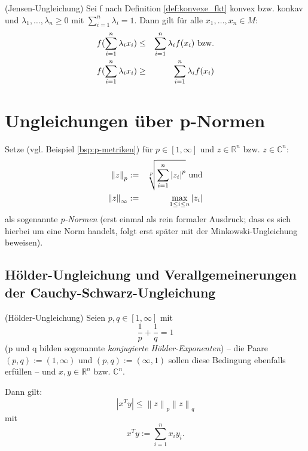 \documentclass[10pt]{scrbook}
\begin{document}
\begin{Sa} (Jensen-Ungleichung)
Sei f nach Definition \ref{def:konvexe_fkt} konvex bzw. konkav und $\lambda_1, \ldots, \lambda_n\geq 0$ mit $\sum_{i=1}^n \lambda_i =1$. Dann gilt für alle $x_1, \ldots, x_n\in M$:
\begin{eqnarray*}
f(\sum_{i=1}^n \lambda_i x_i) & \leq & \sum_{i=1}^n \lambda_i f(x_i) \textnormal{ bzw.}\\
f(\sum_{i=1}^n \lambda_i x_i) & \geq & \sum_{i=1}^n \lambda_i f(x_i)
\end{eqnarray*}
\end{Sa}

\section{Ungleichungen über p-Normen}

\begin{Def}
Setze (vgl. Beispiel \ref{bsp:p-metriken}) für $p\in\left[1, \infty\right]$ und $z\in \mathbb{R}^n$ bzw. $z\in \mathbb{C}^n$:
\begin{eqnarray*}
\left\|z\right\|_p & := & \sqrt[p]{\sum_{i=1}^n \left|z_i\right|^p}\textnormal{ und} \\
\left\|z\right\|_\infty & := &  \max_{1\leq i\leq n} \left|z_i\right|
\end{eqnarray*}
als sogenannte \emph{p-Normen} (erst einmal als rein formaler Ausdruck; dass es sich hierbei um eine Norm handelt, folgt erst später mit der Minkowski-Ungleichung beweisen).
\end{Def}

\subsection{Hölder-Ungleichung und Verallgemeinerungen der Cauchy-Schwarz-Ungleichung}

\begin{Sa} (Hölder-Ungleichung)
Seien $p, q\in\left[1, \infty\right]$ mit
\begin{displaymath}
\frac{1}{p}+\frac{1}{q} = 1
\end{displaymath}
(p und q bilden sogenannte \emph{konjugierte Hölder-Exponenten}) -- die Paare $(p, q):=(1, \infty)$ und $(p, q):=(\infty, 1)$ sollen diese Bedingung ebenfalls erfüllen -- und $x, y \in \mathbb{R}^n$ bzw. $\mathbb{C}^n$.

Dann gilt:
\begin{equation}
\left|x^T y\right| \leq \left\|z\right\|_p \left\|z\right\|_q
\end{equation}
mit
\begin{displaymath}
x^T y := \sum_{i=1}^n x_i y_i.
\end{displaymath}
\end{Sa}
\end{document}
